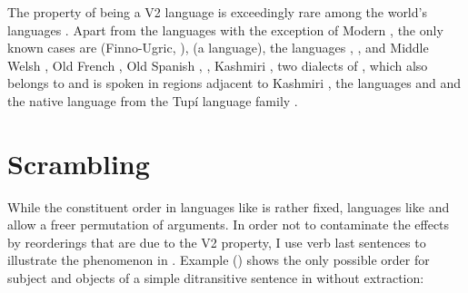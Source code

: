 The property of being a V2 language is exceedingly rare among the world's languages \citep[]{Holmberg2015a}. Apart from the  languages with the exception of 
Modern  \citep{HP86a-ed}, the only known cases are  (Finno-Ugric, \citealp[]{Holmberg2015a}),  \citep[entry~79]{Plank2003b-ed} (a  language), the
 languages  \citep{BK2000a-u},  \citep*[]{BTW2007a-u}, and
Middle Welsh \citep{Willis1998a-u}, Old French \parencites[Section~1.3]{Adams1987a-u}[Section~2.1.2]{Roberts93a-u}[Chapter~2]{Vance97a-u}, Old Spanish
\citep[Section~3.3.2]{Fontana97a-u}, 
 \citep{Poletto2002a-u,Anderson2006a-u}, Kashmiri
\citep[Chapter~4]{Bhatt99a-u}, two dialects of , which also belongs to 
and is spoken in regions adjacent to Kashmiri \citep{Hendriksen90a}, the 
languages  and  \citep[]{Ross2004a-u} and the  native
language  from the Tupí language family \citep{Storto2003a-u}.


\section{Scrambling}
\label{sec-phenomenon-scrambling}

While the constituent order in languages like  is rather fixed, languages like  and
 allow a freer permutation of arguments. In order not to contaminate the effects by
reorderings that are due to the V2 property, I use verb last sentences to illustrate the
phenomenon in . Example () shows the only possible order for subject and objects of a simple
ditransitive sentence in  without extraction:


